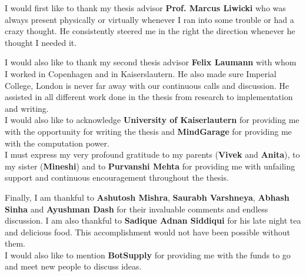 
\begin{acknowledgements}      

I would first like to thank my thesis advisor \textbf{Prof. Marcus Liwicki} who was always present physically or virtually whenever I ran into some trouble or had a crazy thought. He consistently steered me in the right the direction whenever he thought I needed it.

I would also like to thank my second thesis advisor \textbf{Felix Laumann} with whom I worked in Copenhagen and in Kaiserslautern. He also made sure Imperial College, London is never far away with our continuous calls and discussion. He assisted in all different work done in the thesis from research to implementation and writing.\\

I would also like to acknowledge \textbf{University of Kaiserlautern} for providing me with the opportunity for writing the thesis and \textbf{MindGarage} for providing me with the computation power.\\

I must express my very profound gratitude to my parents (\textbf{Vivek} and \textbf{Anita}), to my sister (\textbf{Mineshi}) and to \textbf{Purvanshi Mehta} for providing me with unfailing support and continuous encouragement throughout the thesis. 

Finally, I am thankful to \textbf{Ashutosh Mishra}, \textbf{Saurabh Varshneya}, \textbf{Abhash Sinha} and \textbf{Ayushman Dash} for their invaluable comments and endless discussion. I am also thankful to \textbf{Sadique Adnan Siddiqui} for his late night tea and delicious food. This accomplishment would not have been possible without them. \\

I would also like to mention \textbf{BotSupply} for providing me with the funds to go and meet new people to discuss ideas. \\ \\



\end{acknowledgements}
